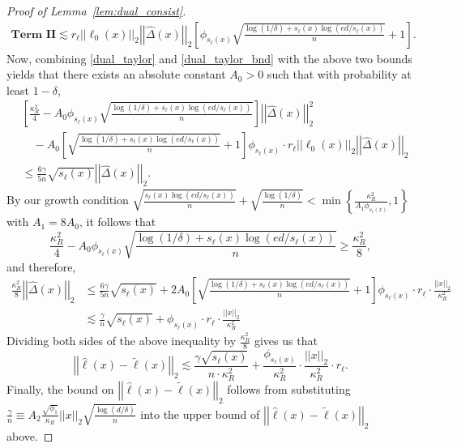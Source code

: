 \documentclass[ejsv2,noshowframe]{imsart}
\theoremstyle{plain}
\theoremstyle{definition}
\theoremstyle{remark}
\newcommand{\norm}[1]{\left|\left| #1 \right|\right|}
\renewcommand{\hat}{\widehat}
\renewcommand{\tilde}{\widetilde}
\begin{document}
\begin{proof}[Proof of Lemma~\ref{lem:dual_consist}]
	\begin{align*}
		\textbf{Term II} \lesssim r_{\ell}\norm{\ell_0(x)}_2\norm{\hat{\Delta}(x)}_2 \left[\phi_{s_{\ell}(x)} \sqrt{\frac{\log(1/\delta)+s_{\ell}(x)\log(ed/s_{\ell}(x))}{n}} + 1\right].
	\end{align*}
	Now, combining \eqref{dual_taylor} and \eqref{dual_taylor_bnd} with the above two bounds yields that there exists an absolute constant $A_0>0$ such that with probability at least $1-\delta$, 
	\begin{align*}
		&\left[\frac{\kappa_R^2}{4} - A_0\phi_{s_{\ell}(x)} \sqrt{\frac{\log(1/\delta)+s_{\ell}(x)\log(ed/s_{\ell}(x))}{n}} \right]\norm{\hat{\Delta}(x)}_2^2 \\
		&\quad - A_0\left[\sqrt{\frac{\log(1/\delta)+s_{\ell}(x)\log(ed/s_{\ell}(x))}{n}} + 1\right]\phi_{s_{\ell}(x)} \cdot r_{\ell} \norm{\ell_0(x)}_2\norm{\hat{\Delta}(x)}_2\\
		&\leq\frac{6\gamma}{5n} \sqrt{s_{\ell}(x)} \norm{\hat{\Delta}(x)}_2.
	\end{align*}
	By our growth condition $\sqrt{\frac{s_{\ell}(x)\log(ed/s_{\ell}(x))}{n}} + \sqrt{\frac{\log(1/\delta)}{n}} < \min\left\{\frac{\kappa_R^2}{A_1 \phi_{s_{\ell}(x)}}, 1 \right\}$ with $A_1=8A_0$, it follows that
	$$\frac{\kappa_R^2}{4} - A_0\phi_{s_{\ell}(x)} \sqrt{\frac{\log(1/\delta)+s_{\ell}(x)\log(ed/s_{\ell}(x))}{n}} \geq \frac{\kappa_R^2}{8},$$
	and therefore,
	\begin{align*}
		\frac{\kappa_R^2}{8} \norm{\hat{\Delta}(x)}_2 &\leq \frac{6\gamma}{5n} \sqrt{s_{\ell}(x)} + 2A_0\left[\sqrt{\frac{\log(1/\delta)+s_{\ell}(x)\log(ed/s_{\ell}(x))}{n}} + 1\right]\phi_{s_{\ell}(x)} \cdot r_{\ell} \cdot \frac{\norm{x}_2}{\kappa_R^2}\\
		&\lesssim \frac{\gamma}{n} \sqrt{s_{\ell}(x)} + \phi_{s_{\ell}(x)} \cdot r_{\ell} \cdot \frac{\norm{x}_2}{\kappa_R^2}
	\end{align*}
	Dividing both sides of the above inequality by $\frac{\kappa_R^2}{8}$ gives us that
	$$\norm{\hat{\ell}(x)  - \tilde{\ell}(x)}_2 \lesssim \frac{\gamma \sqrt{s_{\ell}(x)}}{n \cdot \kappa_R^2} + \frac{\phi_{s_{\ell}(x)}}{\kappa_R^2} \cdot \frac{\norm{x}_2}{\kappa_R^2} \cdot r_{\ell}.$$
	Finally, the bound on $\norm{\hat{\ell}(x) - \tilde{\ell}(x)}_2$ follows from substituting $\frac{\gamma}{n} \equiv A_2 \frac{\sqrt{\phi_1}}{\kappa_R}\norm{x}_2 \sqrt{\frac{\log(d/\delta)}{n}}$ into the upper bound of $\norm{\hat{\ell}(x) - \tilde{\ell}(x)}_2$ above.
\end{proof}
\end{document}
